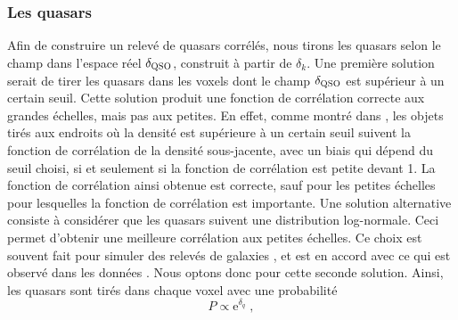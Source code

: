 \documentclass[11pt, twoside, a4paper, openright]{report}
\begin{document}
\subsubsection{Les quasars}
\label{subsubsec:boiteqso}
Afin de construire un relevé de quasars corrélés, nous tirons les quasars selon le champ dans l'espace réel $\delta_{\textsc{QSO}}$, construit à partir de $\delta_k$. Une première solution serait de tirer les quasars dans les voxels dont le champ $\delta_{\textsc{QSO}}$ est supérieur à un certain seuil. Cette solution produit une fonction de corrélation correcte aux grandes échelles, mais pas aux petites.
En effet, comme montré dans \textcite{prov_cite}, les objets tirés aux endroits où la densité est supérieure à un certain seuil suivent la fonction de corrélation de la densité sous-jacente, avec un biais qui dépend du seuil choisi, si et seulement si la fonction de corrélation est petite devant 1. La fonction de corrélation ainsi obtenue est correcte, sauf pour les petites échelles pour lesquelles la fonction de corrélation est importante.
Une solution alternative consiste à considérer que les quasars suivent une distribution log-normale. Ceci permet d'obtenir une meilleure corrélation aux petites échelles.
Ce choix est souvent fait pour simuler des relevés de galaxies \autocite{agrawal_generating_2017}, et est en accord avec ce qui est observé dans les données \autocite{Clerkin2016}.
Nous optons donc pour cette seconde solution. Ainsi, les quasars sont tirés dans chaque voxel avec une probabilité
\begin{equation}
  \label{eq:proba_qso}
  P \propto \mathrm{e}^{\delta_q} \; ,
\end{equation}
\end{document}
